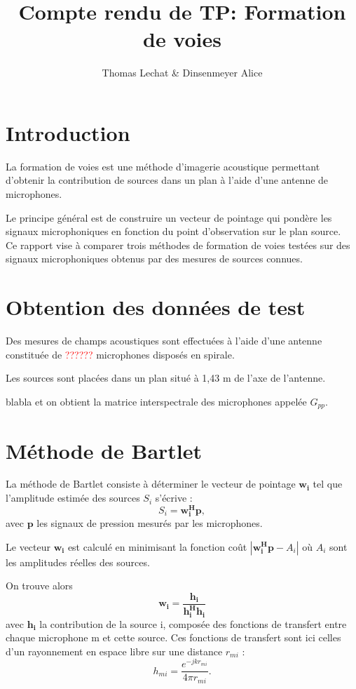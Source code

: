 \documentclass[a4paper]{article}
\title{Compte rendu de TP: Formation de voies }
\author{Thomas Lechat \& Dinsenmeyer Alice}
\renewcommand{\b}[1]{\boldsymbol{#1}}
\begin{document}
\maketitle



\section{Introduction}

La formation de voies est une méthode d'imagerie acoustique permettant d'obtenir la contribution de sources dans un plan à l'aide d'une antenne de microphones. 

Le principe général est de construire un vecteur de pointage qui pondère les signaux microphoniques en fonction du point d'observation sur le plan source.\\

Ce rapport vise à comparer trois méthodes de formation de voies testées sur des signaux microphoniques obtenus par des mesures de sources connues. 

\section{Obtention des données de test}

Des mesures de champs acoustiques sont effectuées à l'aide d'une antenne constituée de \textcolor{red}{??????} microphones disposés en spirale.

Les sources sont placées dans un plan situé à 1,43 m de l'axe de l'antenne. 

blabla  et on obtient la matrice interspectrale des microphones appelée $G_{pp}$.



\section{Méthode de Bartlet}

La méthode de Bartlet consiste à déterminer le vecteur de pointage $\b{w_i}$ tel que l'amplitude estimée des sources $S_i$ s'écrive : $$S_i=\b{w_{i}^{H}p},$$ avec $\b{p}$ les signaux de pression mesurés par les microphones.

Le vecteur $\b{w_i}$ est calculé en minimisant la fonction coût $|\b{w_{i}^{H}p}-A_i|$ où $A_{i}$ sont les amplitudes réelles des sources.

On trouve alors $$\b{w_{i}}=\b{\frac{h_i}{h_{i}^{H}h_{i}}}$$ avec $\b{h_i}$ la contribution de la source i, composée des fonctions de transfert entre chaque microphone m et cette source. Ces fonctions de transfert sont ici celles d'un rayonnement en espace libre sur une distance $r_{mi}$ : $$ h_{mi}=\frac{e^{-jkr_{mi}}}{4\pi r_{mi}}.$$
\end{document}

